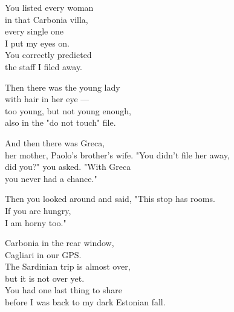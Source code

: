 \begin{lyrics}
You listed every woman\\
in that Carbonia villa,\\
every single one\\
I put my eyes on.\\
You correctly predicted\\
the staff I filed away.

Then there was the young lady\\
with hair in her eye —\\
too young, but not young enough,\\
also in the "do not touch" file.

And then there was Greca,\\
her mother, Paolo's brother's wife.
"You didn't file her away,\\
did you?" you asked.
"With Greca\\
you never had a chance."

Then you looked around and said,
"This stop has rooms.\\
If you are hungry,\\
I am horny too."

Carbonia in the rear window,\\
Cagliari in our GPS.\\
The Sardinian trip is almost over,\\
but it is not over yet.\\
You had one last thing to share\\
before I was back to my dark Estonian fall.
\end{lyrics}

